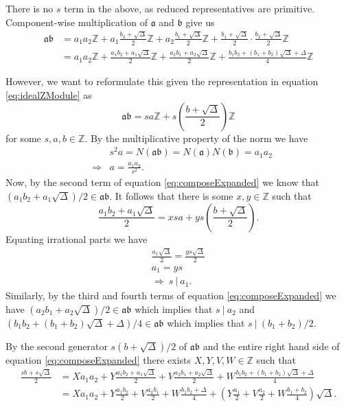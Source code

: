 \documentclass{ucalgthes1}
\theoremstyle{plain}
\theoremstyle{definition}
\newcommand{\ZZ}{\mathbb{Z}}
\begin{document}
\noindent
There is no $s$ term in the above, as reduced representatives are primitive.  Component-wise multiplication of $\mathfrak a$ and $\mathfrak b$ give us
\begin{equation}
\begin{split}
	\mathfrak{a} \mathfrak{b} & = a_1a_2 \ZZ + a_1 \frac{b_2 + \sqrt{\Delta}}{2} \ZZ + a_2 \frac{b_1 + \sqrt{\Delta}}{2} \ZZ + \frac{b_1 + \sqrt{\Delta}}{2} \cdot \frac{b_2 + \sqrt{\Delta}}{2} \ZZ \\
	& = a_1a_2 \ZZ + \frac{a_1b_2 + a_1\sqrt{\Delta}}{2} \ZZ + \frac{a_2b_1 + a_2\sqrt{\Delta}}{2} \ZZ + \frac{b_1b_2 + (b_1+b_2)\sqrt{\Delta} + \Delta}{4} \ZZ \label{eq:composeExpanded}
\end{split}
\end{equation}

\noindent
However, we want to reformulate this given the representation in equation \eqref{eq:idealZModule} as
\[
	\mathfrak{a} \mathfrak{b} = sa \ZZ + s \left(\frac{b + \sqrt{\Delta}}{2}\right) \ZZ
\]
for some $s, a, b \in \ZZ$.  By the multiplicative property of the norm we have
\begin{eqnarray*}
	&& s^2a = N(\mathfrak{a}\mathfrak{b}) = N(\mathfrak{a})N(\mathfrak{b}) = a_1 a_2 \\
	& \Rightarrow & a = \frac{a_1a_2}{s^2}.
\end{eqnarray*}
Now, by the second term of equation \eqref{eq:composeExpanded} we know that $(a_1b_2 + a_1\sqrt{\Delta})/2 \in \mathfrak{a}\mathfrak{b}$.  It follows that there is some $x,y \in \ZZ$ such that
\[
	\frac{a_1b_2 + a_1\sqrt{\Delta}}{2} = xsa + ys\left(\frac{b+\sqrt{\Delta}}{2}\right).
\]
Equating irrational parts we have
\begin{gather*}
	\frac{a_1\sqrt{\Delta}}{2} = \frac{ys\sqrt{\Delta}}{2} \\
	a_1 = ys \\
	\Rightarrow~ s~|~a_1.
\end{gather*}
\noindent
Similarly, by the third and fourth terms of equation \eqref{eq:composeExpanded} we have $(a_2b_1+a_2\sqrt{\Delta})/2 \in \mathfrak{a}\mathfrak{b}$ which implies that $s~|~a_2$ and $(b_1b_2 + (b_1+b_2)\sqrt{\Delta} + \Delta)/4 \in \mathfrak{a}\mathfrak{b}$ which implies that \break $s~|~(b_1+b_2)/2$. 

By the second generator $s(b+\sqrt\Delta)/2$ of $\mathfrak{a}\mathfrak{b}$ and the entire right hand side of equation \eqref{eq:composeExpanded} there exists $X, Y, V, W \in \ZZ$ such that
\begin{equation}
\label{eq:composeSecond}
\begin{split}
	\frac{sb+s\sqrt\Delta}{2} & = Xa_1a_2 + Y\frac{a_1b_2+a_1\sqrt\Delta}{2} + V\frac{a_2b_1 + a_2\sqrt{\Delta}}{2} + W\frac{b_1b_2 + (b_1+b_2)\sqrt{\Delta} + \Delta}{4} \\
	& = Xa_1a_2 + Y\frac{a_1b_2}{2} + V\frac{a_2b_1}{2} + W\frac{b_1b_2 + \Delta}{4} + \left(Y\frac{a_1}{2} + V\frac{a_2}{2} + W\frac{b_1+b_2}{4}\right)\sqrt\Delta. 
\end{split}
\end{equation}
\end{document}
